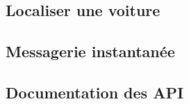 \subsection{Localiser une voiture}
\subsection{Messagerie instantanée}
\subsection{Documentation des API}